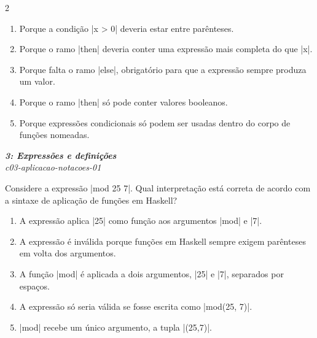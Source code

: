 \documentclass[a4paper,10pt,brazil]{article}
\begin{document}
\begin{multicols}{2}
\begin{enumerate}
  \item Porque a condição \haskellinline|x > 0| deveria estar entre parênteses.

  \item Porque o ramo \haskellinline|then| deveria conter uma expressão mais completa do que \haskellinline|x|.

  \item Porque falta o ramo \haskellinline|else|, obrigatório para que a expressão sempre produza um valor.

  \item Porque o ramo \haskellinline|then| só pode conter valores booleanos.

  \item Porque expressões condicionais só podem ser usadas dentro do corpo de funções nomeadas.


\end{enumerate}

\begin{flushright}
  \footnotesize
  \textit{\textbf{3: Expressões e definições}}\\
  \textit{c03-aplicacao-notacoes-01}\\

\end{flushright}
Considere a expressão \haskellinline|mod 25 7|. Qual interpretação está correta de acordo com a sintaxe de aplicação de funções em Haskell?

\begin{enumerate}
  \item A expressão aplica \haskellinline|25| como função aos argumentos \haskellinline|mod| e \haskellinline|7|.

  \item A expressão é inválida porque funções em Haskell sempre exigem parênteses em volta dos argumentos.

  \item A função \haskellinline|mod| é aplicada a dois argumentos, \haskellinline|25| e \haskellinline|7|, separados por espaços.

  \item A expressão só seria válida se fosse escrita como \haskellinline|mod(25, 7)|.

  \item \haskellinline|mod| recebe um único argumento, a tupla \haskellinline|(25,7)|.


\end{enumerate}


\end{multicols}
\end{document}
